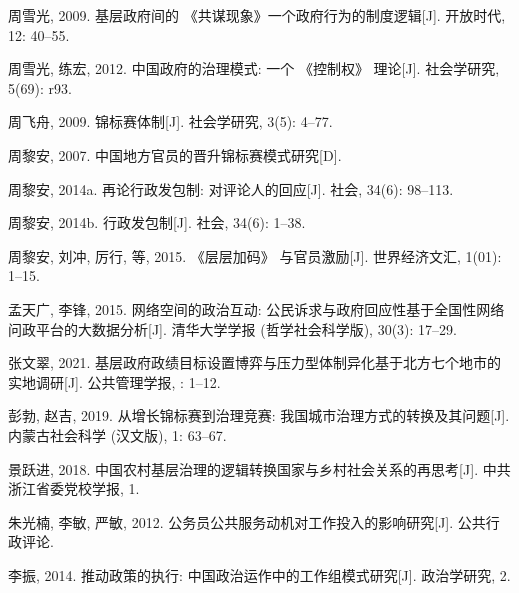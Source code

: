 \documentclass[
  12pt,
]{ctexart}
\newlength{\cslhangindent}
\newlength{\cslentryspacingunit} %
\newenvironment{CSLReferences}[2] %
 {%
  \setlength{\parindent}{0pt}
  \ifodd #1
  \let\oldpar\par
  \def\par{\hangindent=\cslhangindent\oldpar}
  \fi
  \setlength{\parskip}{#2\cslentryspacingunit}
 }%
 {}
\begin{document}
\begin{CSLReferences}{1}{0}
\leavevmode{}%
周雪光, 2009. 基层政府间的 {《共谋现象》}\textemdash\textemdash 一个政府行为的制度逻辑{[}J{]}. 开放时代, 12: 40--55.

\leavevmode{}%
周雪光, 练宏, 2012. 中国政府的治理模式: 一个 {《控制权》} 理论{[}J{]}. 社会学研究, 5(69): r93.

\leavevmode{}%
周飞舟, 2009. 锦标赛体制{[}J{]}. 社会学研究, 3(5): 4--77.

\leavevmode{}%
周黎安, 2007. 中国地方官员的晋升锦标赛模式研究{[}D{]}.

\leavevmode{}%
周黎安, 2014a. 再论行政发包制: 对评论人的回应{[}J{]}. 社会, 34(6): 98--113.

\leavevmode{}%
周黎安, 2014b. 行政发包制{[}J{]}. 社会, 34(6): 1--38.

\leavevmode{}%
周黎安, 刘冲, 厉行, 等, 2015. {《层层加码》} 与官员激励{[}J{]}. 世界经济文汇, 1(01): 1--15.

\leavevmode{}%
孟天广, 李锋, 2015. 网络空间的政治互动: 公民诉求与政府回应性\textemdash\textemdash 基于全国性网络问政平台的大数据分析{[}J{]}. 清华大学学报 (哲学社会科学版), 30(3): 17--29.

\leavevmode{}%
张文翠, 2021. 基层政府政绩目标设置博弈与压力型体制异化\textemdash\textemdash 基于北方七个地市的实地调研{[}J{]}. 公共管理学报, : 1--12.

\leavevmode{}%
彭勃, 赵吉, 2019. 从增长锦标赛到治理竞赛: 我国城市治理方式的转换及其问题{[}J{]}. 内蒙古社会科学 (汉文版), 1: 63--67.

\leavevmode{}%
景跃进, 2018. 中国农村基层治理的逻辑转换\textemdash\textemdash 国家与乡村社会关系的再思考{[}J{]}. 中共浙江省委党校学报, 1.

\leavevmode{}%
朱光楠, 李敏, 严敏, 2012. 公务员公共服务动机对工作投入的影响研究{[}J{]}. 公共行政评论.

\leavevmode{}%
李振, 2014. 推动政策的执行: 中国政治运作中的工作组模式研究{[}J{]}. 政治学研究, 2.


\end{CSLReferences}
\end{document}
